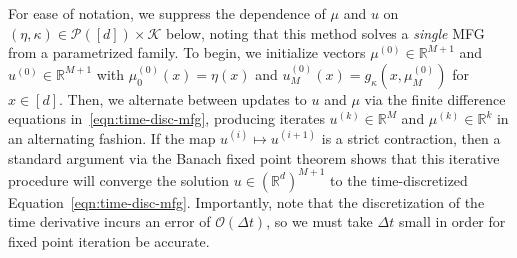 \documentclass[11pt,reqno]{amsart}
\numberwithin{equation}{section}
\theoremstyle{plain}
\newcommand{\R}{\mathbb{R}}
\newcommand{\calK}{{\mathcal K}}
\newcommand{\calP}{{\mathcal P}}
\newcommand{\1}{\boldsymbol{\mathbbm{1}}}
\begin{document}
For ease of notation, we suppress the dependence of $\mu$ and $u$ on $(\eta, \kappa) \in \calP([d]) \times \calK$ below, noting that this method solves a \textit{single} MFG from a parametrized family. To begin, we initialize vectors $\mu^{(0)} \in \R^{M + 1}$ and $u^{(0)} \in \R^{M + 1}$ with $\mu^{(0)}_0(x) = \eta(x)$ and $u^{(0)}_M(x) = g_{\kappa}(x, \mu^{(0)}_M)$ for $x \in [d]$. Then, we alternate between updates to $u$ and $\mu$ via the finite difference equations in~\eqref{eqn:time-disc-mfg}, producing iterates $u^{(k)} \in \R^{M}$ and $\mu^{(k)} \in \R^k$ in an alternating fashion. If the map $u^{(i)} \mapsto u^{(i + 1)}$ is a strict contraction, then a standard argument via the Banach fixed point theorem shows that this iterative procedure will converge the solution $u \in (\R^d)^{M + 1}$ to the time-discretized Equation~\eqref{eqn:time-disc-mfg}. Importantly, note that the discretization of the time derivative incurs an error of $\mathcal{O}(\Delta t)$, so we must take $\Delta t$ small in order for fixed point iteration be accurate.
\end{document}
